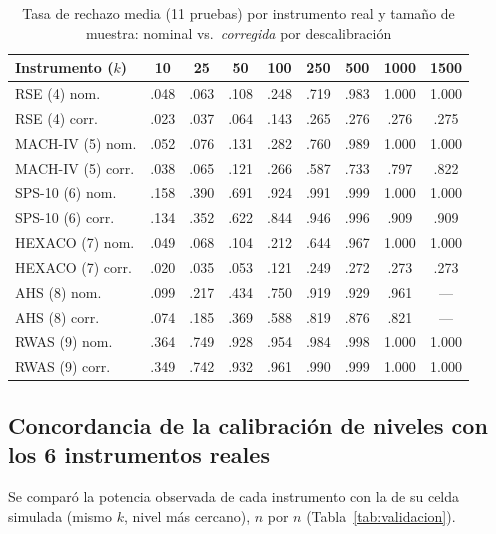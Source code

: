 \documentclass[man,mask,donotrepeattitle,floatsintext]{apa7}
\begin{document}
\begin{table}[H]
\caption{Tasa de rechazo media (11 pruebas) por instrumento real y tamaño de muestra: nominal vs.\ \emph{corregida} por descalibración}
\label{tab:potencia-instrumento}
\begin{tabular}{lcccccccc}
\toprule
Instrumento ($k$) & 10 & 25 & 50 & 100 & 250 & 500 & 1000 & 1500 \\
\midrule
RSE (4) nom. & .048 & .063 & .108 & .248 & .719 & .983 & 1.000 & 1.000 \\
RSE (4) corr. & .023 & .037 & .064 & .143 & .265 & .276 & .276 & .275 \\
MACH-IV (5) nom. & .052 & .076 & .131 & .282 & .760 & .989 & 1.000 & 1.000 \\
MACH-IV (5) corr. & .038 & .065 & .121 & .266 & .587 & .733 & .797 & .822 \\
SPS-10 (6) nom. & .158 & .390 & .691 & .924 & .991 & .999 & 1.000 & 1.000 \\
SPS-10 (6) corr. & .134 & .352 & .622 & .844 & .946 & .996 & .909 & .909 \\
HEXACO (7) nom. & .049 & .068 & .104 & .212 & .644 & .967 & 1.000 & 1.000 \\
HEXACO (7) corr. & .020 & .035 & .053 & .121 & .249 & .272 & .273 & .273 \\
AHS (8) nom. & .099 & .217 & .434 & .750 & .919 & .929 & .961 & --- \\
AHS (8) corr. & .074 & .185 & .369 & .588 & .819 & .876 & .821 & --- \\
RWAS (9) nom. & .364 & .749 & .928 & .954 & .984 & .998 & 1.000 & 1.000 \\
RWAS (9) corr. & .349 & .742 & .932 & .961 & .990 & .999 & 1.000 & 1.000 \\
\bottomrule
\end{tabular}
\end{table}

\subsection{Concordancia de la calibración de niveles con los 6 instrumentos reales}
\label{sec:res-validacion}

Se comparó la potencia observada de cada instrumento con la de su celda simulada (mismo $k$, nivel más cercano), $n$ por $n$ (Tabla~\ref{tab:validacion}).
\end{document}

